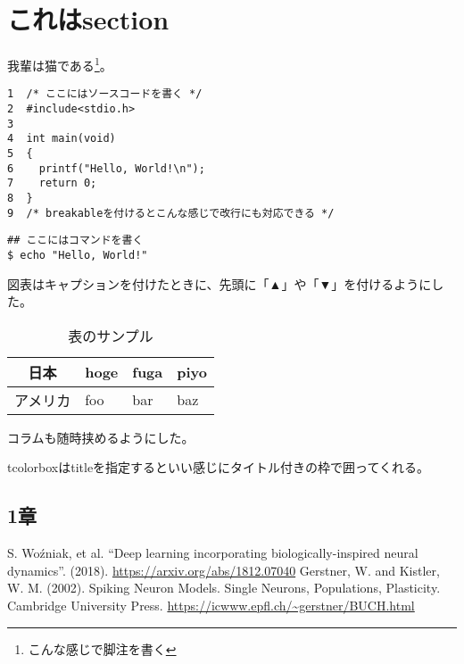 \documentclass[11pt,dvipdfmx,b5paper,oneside]{jsbook}
\begin{document}
\section{これはsection}
我輩は猫である\footnote{こんな感じで脚注を書く}。


\begin{tcolorbox}[breakable]
\begin{verbatim}
1  /* ここにはソースコードを書く */
2  #include<stdio.h>
3
4  int main(void)
5  {
6    printf("Hello, World!\n");
7    return 0;
8  }
9  /* breakableを付けるとこんな感じで改行にも対応できる */
\end{verbatim}
\end{tcolorbox}

\begin{shaded}
\begin{verbatim}
## ここにはコマンドを書く
$ echo "Hello, World!"
\end{verbatim}
\end{shaded}

図表はキャプションを付けたときに、先頭に「▲」や「▼」を付けるようにした。

\begin{table}[H]
  \centering
  \caption{表のサンプル}
  \begin{tabular}{|c|l|l|l|} \hline
    日本 & hoge & fuga & piyo \\ \hline
    アメリカ & foo & bar & baz \\ \hline
  \end{tabular}
  \label{table-sample}
\end{table}

\begin{tcolorbox}[title=これはコラム]
  コラムも随時挟めるようにした。

  tcolorboxはtitleを指定するといい感じにタイトル付きの枠で囲ってくれる。
\end{tcolorbox}

\begin{thebibliography}{99}
\subsection*{1章}
 S. Woźniak, et al. ``Deep learning incorporating biologically-inspired neural dynamics''. (2018). \url{https://arxiv.org/abs/1812.07040}
 Gerstner, W. and Kistler, W. M. (2002). Spiking Neuron Models. Single Neurons, Populations, Plasticity. Cambridge University Press. \url{https://icwww.epfl.ch/~gerstner/BUCH.html}
\end{thebibliography}
\end{document}
